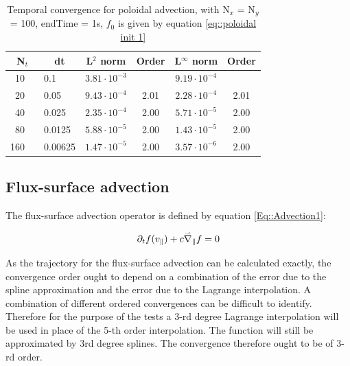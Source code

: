 \begin{table}[ht]
\centering
 \begin{tabular}{|r c|l|c|c|c|c|}
  \hline
  \multicolumn{2}{|c|}{\bf N$_t$} & \multicolumn{1}{|c|}{\bf dt} & \bf L$^2$ norm       & \bf Order & \bf L$^\infty$ norm  & \bf Order\\
  \hline
  10  & &  0.1     & $ 3.81 \cdot 10^{ -3 }$ &       & $ 9.19 \cdot 10^{ -4 }$ &  \\
  \hline
  20  & &  0.05     & $ 9.43 \cdot 10^{ -4 }$ &  2.01  & $ 2.28 \cdot 10^{ -4 }$ &  2.01  \\
  \hline
  40  & &  0.025     & $ 2.35 \cdot 10^{ -4 }$ &  2.00  & $ 5.71 \cdot 10^{ -5 }$ &  2.00  \\
  \hline
  80  & &  0.0125     & $ 5.88 \cdot 10^{ -5 }$ &  2.00  & $ 1.43 \cdot 10^{ -5 }$ &  2.00  \\
  \hline
  160  & &  0.00625   & $ 1.47 \cdot 10^{ -5 }$ &  2.00  & $ 3.57 \cdot 10^{ -6 }$ &  2.00  \\
  \hline
 \end{tabular}
 \caption{\label{Poloidal dt convergence} Temporal convergence for poloidal advection, with N$_x$ = N$_y$ = 100, endTime = 1s, $f_0$ is given by equation \ref{eq::poloidal init 1}}
\end{table}

\subsection{Flux-surface advection}

The flux-surface advection operator is defined by equation \ref{Eq::Advection1}:

\begin{equation}
 \partial_t f(v_\parallel) + c \accentset{\rightharpoonup}{\nabla}_\parallel f = 0
\end{equation}

As the trajectory for the flux-surface advection can be calculated exactly, the convergence order ought to depend on a combination of the error due to the spline approximation and the error due to the Lagrange interpolation. A combination of different ordered convergences can be difficult to identify. Therefore for the purpose of the tests a 3-rd degree Lagrange interpolation will be used in place of the 5-th order interpolation. The function will still be approximated by 3rd degree splines. The convergence therefore ought to be of 3-rd order.

